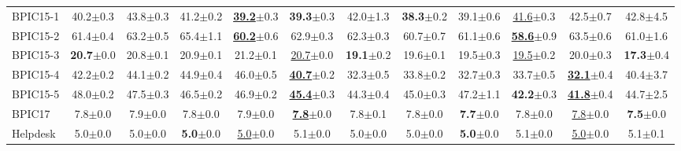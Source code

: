 \begin{table}[t]
\begin{adjustbox}{max width=\textwidth}
\begin{tabular}{@{}lccccc|ccccc|c@{}}
BPIC15-1 & 40.2{\scriptsize$\pm$0.3} & 43.8{\scriptsize$\pm$0.3} & 41.2{\scriptsize$\pm$0.2} & \underline{\textbf{39.2}}{\scriptsize$\pm$0.3} & \textbf{39.3}{\scriptsize$\pm$0.3} & 42.0{\scriptsize$\pm$1.3} & \textbf{38.3}{\scriptsize$\pm$0.2} & 39.1{\scriptsize$\pm$0.6} & \underline{41.6}{\scriptsize$\pm$0.3} & 42.5{\scriptsize$\pm$0.7} & 42.8{\scriptsize$\pm$4.5} \\
BPIC15-2 & 61.4{\scriptsize$\pm$0.4} & 63.2{\scriptsize$\pm$0.5} & 65.4{\scriptsize$\pm$1.1} & \underline{\textbf{60.2}}{\scriptsize$\pm$0.6} & 62.9{\scriptsize$\pm$0.3} & 62.3{\scriptsize$\pm$0.3} & 60.7{\scriptsize$\pm$0.7} & 61.1{\scriptsize$\pm$0.6} & \underline{\textbf{58.6}}{\scriptsize$\pm$0.9} & 63.5{\scriptsize$\pm$0.6} & 61.0{\scriptsize$\pm$1.6} \\
BPIC15-3 & \textbf{20.7}{\scriptsize$\pm$0.0} & 20.8{\scriptsize$\pm$0.1} & 20.9{\scriptsize$\pm$0.1} & 21.2{\scriptsize$\pm$0.1} & \underline{20.7}{\scriptsize$\pm$0.0} & \textbf{19.1}{\scriptsize$\pm$0.2} & 19.6{\scriptsize$\pm$0.1} & 19.5{\scriptsize$\pm$0.3} & \underline{19.5}{\scriptsize$\pm$0.2} & 20.0{\scriptsize$\pm$0.3} & \textbf{17.3}{\scriptsize$\pm$0.4} \\
BPIC15-4 & 42.2{\scriptsize$\pm$0.2} & 44.1{\scriptsize$\pm$0.2} & 44.9{\scriptsize$\pm$0.4} & 46.0{\scriptsize$\pm$0.5} & \underline{\textbf{40.7}}{\scriptsize$\pm$0.2} & 32.3{\scriptsize$\pm$0.5} & 33.8{\scriptsize$\pm$0.2} & 32.7{\scriptsize$\pm$0.3} & 33.7{\scriptsize$\pm$0.5} & \underline{\textbf{32.1}}{\scriptsize$\pm$0.4} & 40.4{\scriptsize$\pm$3.7} \\
BPIC15-5 & 48.0{\scriptsize$\pm$0.2} & 47.5{\scriptsize$\pm$0.3} & 46.5{\scriptsize$\pm$0.2} & 46.9{\scriptsize$\pm$0.2} & \underline{\textbf{45.4}}{\scriptsize$\pm$0.3} & 44.3{\scriptsize$\pm$0.4} & 45.0{\scriptsize$\pm$0.3} & 47.2{\scriptsize$\pm$1.1} & \textbf{42.2}{\scriptsize$\pm$0.3} & \underline{\textbf{41.8}}{\scriptsize$\pm$0.4} & 44.7{\scriptsize$\pm$2.5} \\
BPIC17 & 7.8{\scriptsize$\pm$0.0} & 7.9{\scriptsize$\pm$0.0} & 7.8{\scriptsize$\pm$0.0} & 7.9{\scriptsize$\pm$0.0} & \underline{\textbf{7.8}}{\scriptsize$\pm$0.0} & 7.8{\scriptsize$\pm$0.1} & 7.8{\scriptsize$\pm$0.0} & \textbf{7.7}{\scriptsize$\pm$0.0} & 7.8{\scriptsize$\pm$0.0} & \underline{7.8}{\scriptsize$\pm$0.0} & \textbf{7.5}{\scriptsize$\pm$0.0} \\
Helpdesk & 5.0{\scriptsize$\pm$0.0} & 5.0{\scriptsize$\pm$0.0} & \textbf{5.0}{\scriptsize$\pm$0.0} & \underline{5.0}{\scriptsize$\pm$0.0} & 5.1{\scriptsize$\pm$0.0} & 5.0{\scriptsize$\pm$0.0} & 5.0{\scriptsize$\pm$0.0} & \textbf{5.0}{\scriptsize$\pm$0.0} & 5.1{\scriptsize$\pm$0.0} & \underline{5.0}{\scriptsize$\pm$0.0} & 5.1{\scriptsize$\pm$0.1} \\

\end{tabular}
\end{adjustbox}
\end{table}
